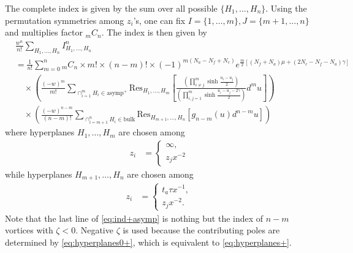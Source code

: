 \documentclass[a4paper,11pt]{article}
\begin{document}
The complete index is given by the sum over all possible $\{H_1,\ldots,H_n\}$. Using the permutation symmetries among $z_i$'s, one can fix $I = \{1,\ldots,m\},J = \{m+1,\ldots,n\}$ and multiplies factor ${}_m C_n$. The index is then given by
\begin{align}
\label{eq:ind+asymp}
%
& \frac{w^n}{n!} \sum_{H_1,\ldots,H_n} I^n_{H_1,\ldots,H_n} \nonumber \\
&= \frac{1}{n!} \sum_{m = 0}^n {}_m C_n \times m! \times (n-m)! \times (-1)^{m (N_a-N_f+N_c)} e^{\frac{m}{2} [(N_f+N_a) \mu+(2 N_c-N_f-N_a) \gamma]} \nonumber \\
%
&\quad \times \left(\frac{(-w)^m}{m!} \sum_{\cap_{i = 1}^m H_i \in \text{asymp}^+} \mathrm{Res}_{H_1,\ldots,H_m} \left[\frac{\left(\prod_{i \neq j}^m \sinh \frac{u_i-u_j}{2}\right)}{\left(\prod_{i,j = 1}^m \sinh \frac{u_i-u_j-2 \gamma}{2}\right)} d^m u\right]\right) \nonumber \\
%
&\quad \times \left(\frac{(-w)^{n-m}}{(n-m)!} \sum_{\cap_{i = m+1}^n H_i \in \text{bulk}} \mathrm{Res}_{H_{m+1},\ldots,H_n} [g_{n-m}(u) d^{n-m} u]\right)
%
\end{align}
where hyperplanes $H_1,\ldots,H_m$ are chosen among
\begin{align}
z_i &= \left\{\begin{array}{l}
\infty, \\
z_j x^{-2}
\end{array}\right.
\end{align}
while hyperplanes $H_{m+1},\ldots,H_n$ are chosen among
\begin{align}
\label{eq:hyperplanes0+}
z_i &= \left\{\begin{array}{l}
t_a \tau x^{-1}, \\
z_j x^{-2}.
\end{array}\right.
\end{align}
Note that the last line of \eqref{eq:ind+asymp} is nothing but the index of $n-m$ vortices with $\zeta < 0$. Negative $\zeta$ is used because the contributing poles are determined by \eqref{eq:hyperplanes0+}, which is equivalent to \eqref{eq:hyperplanes+}.
\end{document}
